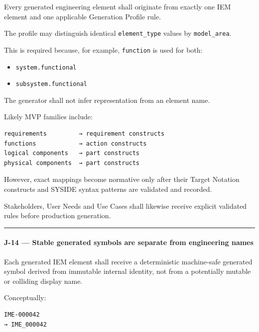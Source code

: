 Every generated engineering element shall originate from exactly one IEM element and one applicable Generation Profile rule.

The profile may distinguish identical \texttt{element\_type} values by \texttt{model\_area}.

This is required because, for example, \texttt{function} is used for both:

\begin{itemize}
\tightlist
\item
  \texttt{system.functional}
\item
  \texttt{subsystem.functional}
\end{itemize}

The generator shall not infer representation from an element name.

Likely MVP families include:

\begin{verbatim}
requirements         → requirement constructs
functions            → action constructs
logical components   → part constructs
physical components  → part constructs
\end{verbatim}

However, exact mappings become normative only after their Target Notation constructs and SYSIDE syntax patterns are validated and recorded.

Stakeholders, User Needs and Use Cases shall likewise receive explicit validated rules before production generation.

\begin{center}\rule{0.5\linewidth}{0.5pt}\end{center}

\hypertarget{j-14--stable-generated-symbols-are-separate-from-engineering-names}{%
\paragraph{J-14 --- Stable generated symbols are separate from engineering names}\label{j-14--stable-generated-symbols-are-separate-from-engineering-names}}

Each generated IEM element shall receive a deterministic machine-safe generated symbol derived from immutable internal identity, not from a potentially mutable or colliding display name.

Conceptually:

\begin{verbatim}
IME-000042
→ IME_000042
\end{verbatim}

